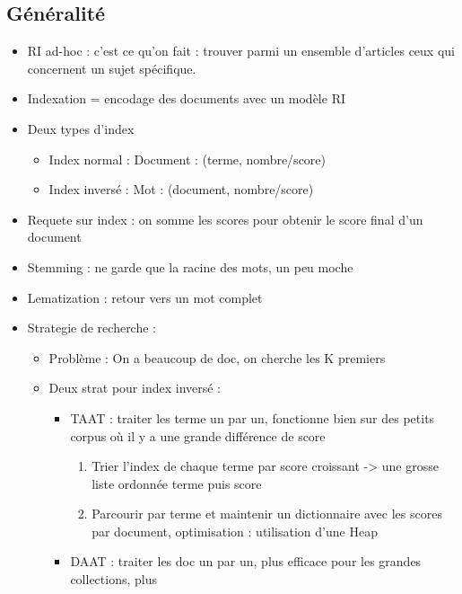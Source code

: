 \documentclass{article}
\begin{document}
\begin{multicols}{2}
\section{Généralité}
\begin{itemize}
    \item RI ad-hoc : c'est ce qu'on fait : trouver parmi un ensemble d'articles ceux qui concernent un sujet spécifique.
    \item Indexation = encodage des documents avec un modèle RI
    \item Deux types d'index \begin{itemize}
        \item Index normal : Document : (terme, nombre/score)
        \item Index inversé : Mot : (document, nombre/score)
    \end{itemize}
    \item Requete sur index : on somme les scores pour obtenir le score final d'un document
    \item Stemming : ne garde que la racine des mots, un peu moche 
    \item Lematization : retour vers un mot complet
    \item Strategie de recherche : \begin{itemize}
        \item Problème : On a beaucoup de doc, on cherche les K premiers
        \item Deux strat  pour index inversé : \begin{itemize}
            \item TAAT : traiter les terme un par un, fonctionne bien sur des petits corpus où il y a une grande différence de score \begin{enumerate}
                \item Trier l'index de chaque terme par score croissant -> une grosse liste ordonnée terme puis score 
                \item Parcourir par terme et maintenir un dictionnaire avec les scores par document, optimisation : utilisation d'une Heap
            \end{enumerate}
            \item DAAT : traiter les doc un par un, plus efficace pour les grandes collections, plus 
        \end{itemize}
    \end{itemize}
\end{itemize}




\end{multicols}
\end{document}
